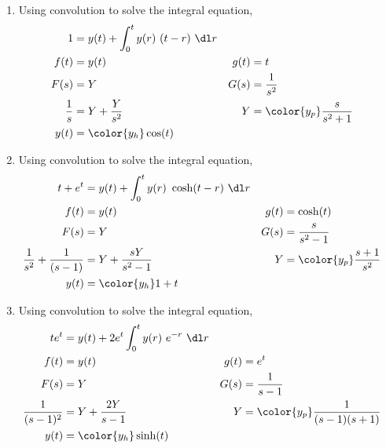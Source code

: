 \begin{enumerate}
    \item Using convolution to solve the integral equation,
          \begin{align}
              1           & = y(t) + \int_{0}^{t} y(r)\ (t - r)\ \dl r   \\
              f(t)        & = y(t)                                     &
              g(t)        & = t                                          \\
              F(s)        & = Y                                        &
              G(s)        & = \frac{1}{s^2}                              \\
              \frac{1}{s} & = Y + \frac{Y}{s^2}                        &
              Y           & = \color{y_p} \frac{s}{s^2 + 1}              \\
              y(t)        & = \color{y_h} \cos(t)
          \end{align}

    \item Using convolution to solve the integral equation,
          \begin{align}
              t + e^t           & = y(t) + \int_{0}^{t} y(r)\ \cosh(t - r)\ \dl r   \\
              f(t)              & = y(t)                                          &
              g(t)              & = \cosh(t)                                        \\
              F(s)              & = Y                                             &
              G(s)              & = \frac{s}{s^2 - 1}                               \\
              \frac{1}{s^2}
              + \frac{1}{(s-1)} & = Y + \frac{sY}{s^2 - 1}                        &
              Y                 & = \color{y_p} \frac{s + 1}{s^2}                   \\
              y(t)              & = \color{y_h} 1 + t
          \end{align}

    \item Using convolution to solve the integral equation,
          \begin{align}
              t e^t             & = y(t) + 2e^t\int_{0}^{t} y(r)\ e^{-r}\ \dl r   \\
              f(t)              & = y(t)                                        &
              g(t)              & = e^{t}                                         \\
              F(s)              & = Y                                           &
              G(s)              & = \frac{1}{s - 1}                               \\
              \frac{1}{(s-1)^2} & = Y + \frac{2Y}{s - 1}                        &
              Y                 & = \color{y_p} \frac{1}{(s-1)(s + 1)}            \\
              y(t)              & = \color{y_h} \sinh(t)
          \end{align}


\end{enumerate}
